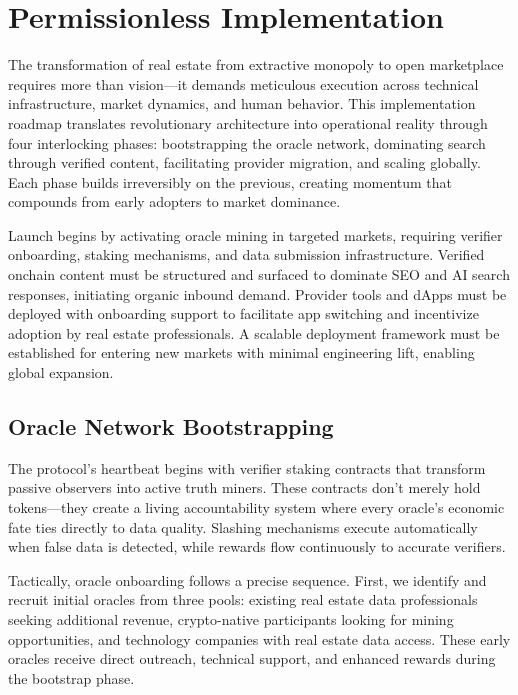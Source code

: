 \chapter{Permissionless Implementation}

The transformation of real estate from extractive monopoly to open marketplace requires more than vision—it demands meticulous execution across technical infrastructure, market dynamics, and human behavior. This implementation roadmap translates revolutionary architecture into operational reality through four interlocking phases: bootstrapping the oracle network, dominating search through verified content, facilitating provider migration, and scaling globally. Each phase builds irreversibly on the previous, creating momentum that compounds from early adopters to market dominance.

Launch begins by activating oracle mining in targeted markets, requiring verifier onboarding, staking mechanisms, and data submission infrastructure. Verified onchain content must be structured and surfaced to dominate SEO and AI search responses, initiating organic inbound demand. Provider tools and dApps must be deployed with onboarding support to facilitate app switching and incentivize adoption by real estate professionals. A scalable deployment framework must be established for entering new markets with minimal engineering lift, enabling global expansion.

\section{Oracle Network Bootstrapping}

The protocol's heartbeat begins with verifier staking contracts that transform passive observers into active truth miners. These contracts don't merely hold tokens—they create a living accountability system where every oracle's economic fate ties directly to data quality. Slashing mechanisms execute automatically when false data is detected, while rewards flow continuously to accurate verifiers.

Tactically, oracle onboarding follows a precise sequence. First, we identify and recruit initial oracles from three pools: existing real estate data professionals seeking additional revenue, crypto-native participants looking for mining opportunities, and technology companies with real estate data access. These early oracles receive direct outreach, technical support, and enhanced rewards during the bootstrap phase. 

